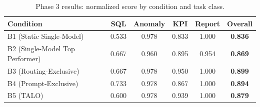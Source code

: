 \begin{table}[htbp]
\centering
\caption{Phase 3 results: normalized score by condition and task class.}
\label{tab:phase3-results}
\begin{tabular}{lccccc}
\toprule
Condition & SQL & Anomaly & KPI & Report & Overall \\
\midrule
B1 (Static Single-Model) & 0.533 & 0.978 & 0.833 & 1.000 & \textbf{0.836} \\
B2 (Single-Model Top Performer) & 0.667 & 0.960 & 0.895 & 0.954 & \textbf{0.869} \\
B3 (Routing-Exclusive) & 0.667 & 0.978 & 0.950 & 1.000 & \textbf{0.899} \\
B4 (Prompt-Exclusive) & 0.733 & 0.978 & 0.867 & 1.000 & \textbf{0.894} \\
B5 (TALO) & 0.600 & 0.978 & 0.939 & 1.000 & \textbf{0.879} \\
\bottomrule
\end{tabular}
\end{table}
